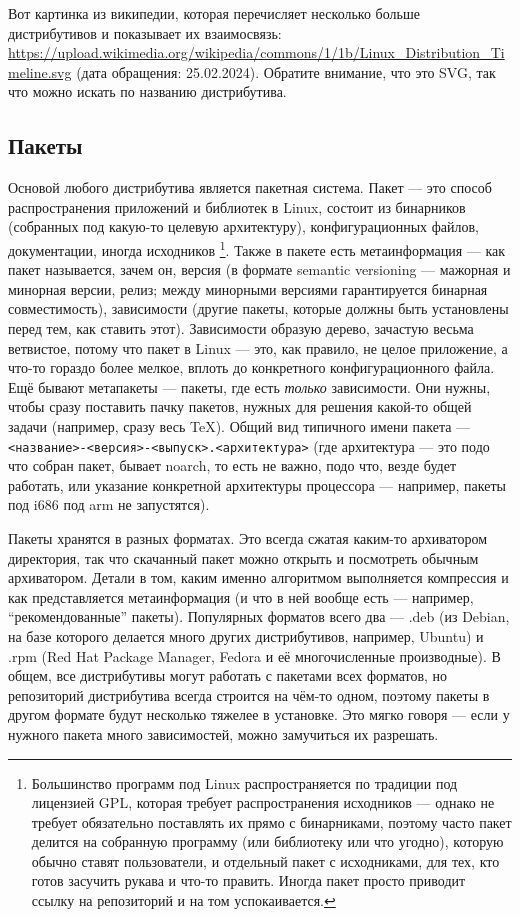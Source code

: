 \documentclass{../../text-style}
\begin{document}
Вот картинка из википедии, которая перечисляет несколько больше дистрибутивов и показывает их взаимосвязь: \url{https://upload.wikimedia.org/wikipedia/commons/1/1b/Linux_Distribution_Timeline.svg} (дата обращения: 25.02.2024).
Обратите внимание, что это SVG, так что можно искать по названию дистрибутива.

\subsection{Пакеты}

Основой любого дистрибутива является пакетная система. 
Пакет --- это способ распространения приложений и библиотек в Linux, состоит из бинарников (собранных под какую-то целевую архитектуру), конфигурационных файлов, документации, иногда исходников%
\footnote{Большинство программ под Linux распространяется по традиции под лицензией GPL, которая требует распространения исходников --- однако не требует обязательно поставлять их прямо с бинарниками, поэтому часто пакет делится на собранную программу (или библиотеку или что угодно), которую обычно ставят пользователи, и отдельный пакет с исходниками, для тех, кто готов засучить рукава и что-то править. Иногда пакет просто приводит ссылку на репозиторий и на том успокаивается.}.
Также в пакете есть метаинформация --- как пакет называется, зачем он, версия (в формате semantic versioning --- мажорная и минорная версии, релиз; между минорными версиями гарантируется бинарная совместимость), зависимости (другие пакеты, которые должны быть установлены перед тем, как ставить этот).
Зависимости образую дерево, зачастую весьма ветвистое, потому что пакет в Linux --- это, как правило, не целое приложение, а что-то гораздо более мелкое, вплоть до конкретного конфигурационного файла.
Ещё бывают метапакеты --- пакеты, где есть \emph{только} зависимости.
Они нужны, чтобы сразу поставить пачку пакетов, нужных для решения какой-то общей задачи (например, сразу весь TeX).
Общий вид типичного имени пакета --- \texttt{<название>-<версия>-<выпуск>.<архитектура>} (где архитектура --- это подо что собран пакет, бывает noarch, то есть не важно, подо что, везде будет работать, или указание конкретной архитектуры процессора --- например, пакеты под i686 под arm не запустятся).

Пакеты хранятся в разных форматах.
Это всегда сжатая каким-то архиватором директория, так что скачанный пакет можно открыть и посмотреть обычным архиватором.
Детали в том, каким именно алгоритмом выполняется компрессия и как представляется метаинформация (и что в ней вообще есть --- например, \enquote{рекомендованные} пакеты).
Популярных форматов всего два --- .deb (из Debian, на базе которого делается много других дистрибутивов, например, Ubuntu) и .rpm (Red Hat Package Manager, Fedora и её многочисленные производные).
В общем, все дистрибутивы могут работать с пакетами всех форматов, но репозиторий дистрибутива всегда строится на чём-то одном, поэтому пакеты в другом формате будут несколько тяжелее в установке.
Это мягко говоря --- если у нужного пакета много зависимостей, можно замучиться их разрешать.
\end{document}
